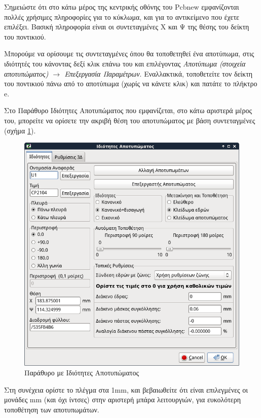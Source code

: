 \documentclass[a4paper]{article}
\begin{document}
Σημειώστε ότι στο κάτω μέρος της κεντρικής οθόνης του Pcbnew εμφανίζονται πολλές χρήσιμες πληροφορίες για το κύκλωμα, και για το αντικείμενο που έχετε επιλέξει. Βασική πληροφορία είναι οι συντεταγμένες Χ και Ψ της θέσης του δείκτη του ποντικιού.

Μπορούμε να ορίσουμε τις συντεταγμένες όπου θα τοποθετηθεί ένα αποτύπωμα, στις ιδιότητές του κάνοντας δεξί κλικ επάνω του και επιλέγοντας \textit{Αποτύπωμα (στοιχεία αποτυπώματος) $\rightarrow$ Επεξεργασία Παραμέτρων}. Εναλλακτικά, τοποθετείτε τον δείκτη του ποντικιού πάνω από το αποτύπωμα (χωρίς να κάνετε κλικ) και πατάτε το πλήκτρο e.

Στο Παράθυρο Ιδιότητες Αποτυπώματος που εμφανίζεται, στο κάτω αριστερά μέρος του, μπορείτε να ορίσετε την ακριβή θέση του αποτυπώματος με βάση συντεταγμένες (σχήμα \ref{fig:pcb-dial-footprop}).

\begin{figure}
  \begin{center}
    \includegraphics[width=.9\textwidth]{img/pcb-dial-footprop.png}
    \caption{Παράθυρο με Ιδιότητες Αποτυπώματος}
    \label{fig:pcb-dial-footprop}
  \end{center}
\end{figure}


Στη συνέχεια ορίστε το πλέγμα στα 1mm, και βεβαιωθείτε ότι είναι επιλεγμένες οι μονάδες mm (και όχι ίντσες) στην αριστερή μπάρα λειτουργιών, για ευκολότερη τοποθέτηση των αποτυπωμάτων.
\end{document}
